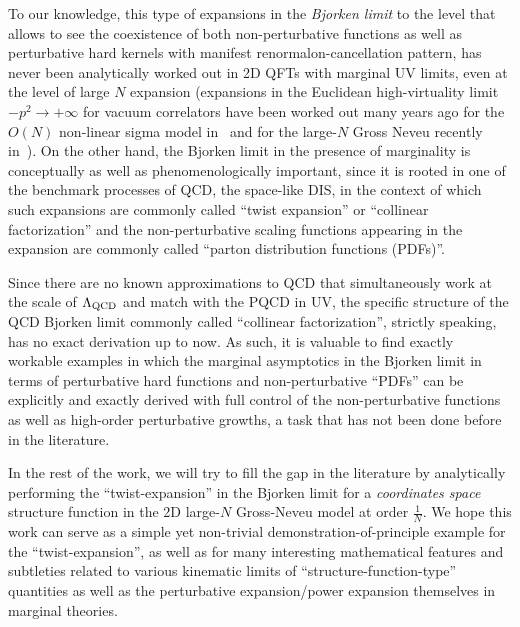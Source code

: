 \documentclass[a4paper,11pt]{article}
\begin{document}
To our knowledge, this type of expansions in the {\it Bjorken limit} to the level that allows to see the coexistence of both non-perturbative functions as well as perturbative hard kernels with manifest renormalon-cancellation pattern,  has never been analytically worked out in 2D QFTs with marginal UV limits, even at the level of large $N$ expansion (expansions in the Euclidean high-virtuality limit $-p^2\rightarrow +\infty$ for vacuum correlators have been worked out many years ago for the $O(N)$ non-linear sigma model in~\cite{Beneke:1998eq} and for the large-$N$ Gross Neveu recently in~\cite{Marino:2024uco}). On the other hand, the Bjorken limit in the presence of marginality is conceptually as well as phenomenologically important, since it is rooted in one of the benchmark processes of QCD, the space-like DIS, in the context of which such expansions are commonly called ``twist expansion'' or ``collinear factorization'' and the non-perturbative scaling functions appearing in the expansion are commonly called ``parton distribution functions (PDFs)''. 

Since there are no known approximations to QCD that simultaneously work at the scale of $\Lambda_{\rm QCD}$ and match with the PQCD in UV, the specific structure of the QCD Bjorken limit commonly called ``collinear factorization'', strictly speaking, has no exact derivation up to now. As such,  it is valuable to find exactly workable examples in which the marginal asymptotics in the Bjorken limit in terms of perturbative hard functions and non-perturbative ``PDFs'' can be explicitly and exactly derived with full control of the non-perturbative functions as well as high-order perturbative growths, a task that has not been done before in the literature.

In the rest of the work, we will try to fill the gap in the literature by analytically performing the ``twist-expansion'' in the Bjorken limit for a {\it coordinates space} structure function in the 2D large-$N$ Gross-Neveu model at order $\frac{1}{N}$. We hope this work can serve as a simple yet non-trivial demonstration-of-principle example for the ``twist-expansion'', as well as for many interesting mathematical features and subtleties related to various kinematic limits of ``structure-function-type'' quantities as well as the perturbative expansion/power expansion themselves in marginal theories.  
\end{document}
